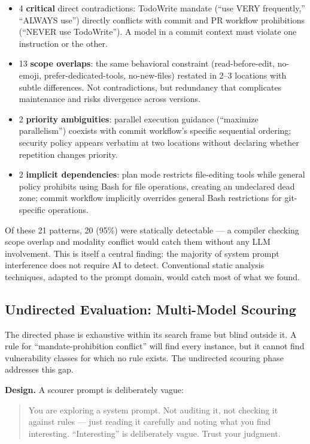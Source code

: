 \begin{itemize}
\tightlist
\item
  4 \textbf{critical} direct contradictions: TodoWrite mandate (``use
  VERY frequently,'' ``ALWAYS use'') directly conflicts with commit and
  PR workflow prohibitions (``NEVER use TodoWrite''). A model in a
  commit context must violate one instruction or the other.
\item
  13 \textbf{scope overlaps}: the same behavioral constraint
  (read-before-edit, no-emoji, prefer-dedicated-tools, no-new-files)
  restated in 2--3 locations with subtle differences. Not
  contradictions, but redundancy that complicates maintenance and risks
  divergence across versions.
\item
  2 \textbf{priority ambiguities}: parallel execution guidance
  (``maximize parallelism'') coexists with commit workflow's specific
  sequential ordering; security policy appears verbatim at two locations
  without declaring whether repetition changes priority.
\item
  2 \textbf{implicit dependencies}: plan mode restricts file-editing
  tools while general policy prohibits using Bash for file operations,
  creating an undeclared dead zone; commit workflow implicitly overrides
  general Bash restrictions for git-specific operations.
\end{itemize}

Of these 21 patterns, 20 (95\%) were statically detectable --- a
compiler checking scope overlap and modality conflict would catch them
without any LLM involvement. This is itself a central finding: the
majority of system prompt interference does not require AI to detect.
Conventional static analysis techniques, adapted to the prompt domain,
would catch most of what we found.

\subsection{Undirected Evaluation: Multi-Model Scouring}

The directed phase is exhaustive within its search frame but blind
outside it. A rule for ``mandate-prohibition conflict'' will find every
instance, but it cannot find vulnerability classes for which no rule
exists. The undirected scouring phase addresses this gap.

\textbf{Design.} A scourer prompt is deliberately vague:

\begin{quote}
You are exploring a system prompt. Not auditing it, not checking it
against rules --- just reading it carefully and noting what you find
interesting. ``Interesting'' is deliberately vague. Trust your judgment.
\end{quote}

